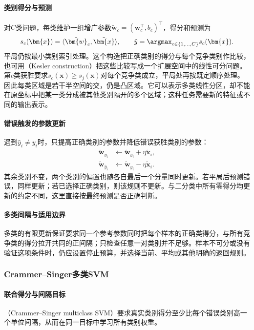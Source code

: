\paragraph{类别得分与预测}
对$C$类问题，每类维护一组增广参数$\tilde{\bm{w}}_c=(\bm{w}_c^{\top},b_c)^{\top}$，得分和预测为
\[
  s_c(\bm{x})=\langle\tilde{\bm{w}}_c,\tilde{\bm{x}}\rangle,
  \qquad
  \hat y=\argmax_{c\in\{1,\ldots,C\}}s_c(\bm{x}).
\]
平局仍按最小类别索引处理。这个构造把正确类别的得分与每个竞争类别作比较，也可用（Kesler construction）把这些比较写成一个扩展空间中的线性可分问题。第$c$类获胜要求$s_c(\bm x)\geq s_j(\bm x)$对每个竞争类成立，平局处再按既定顺序处理。因此每类区域是若干半空间的交，仍是凸区域。它可以表示多类线性分区，却不能在原坐标中把某一类分成被其他类别隔开的多个区域；这种任务需要新的特征或不同的输出表示。

\paragraph{错误触发的参数更新}
遇到$\hat y_i\ne y_i$时，只提高正确类别的参数并降低错误获胜类别的参数：
\begin{equation}
  \label{eq:classification-perceptron-multiclass-update}
  \begin{aligned}
    \tilde{\bm{w}}_{y_i}
      &\leftarrow\tilde{\bm{w}}_{y_i}+\eta\tilde{\bm{x}}_i,\\
    \tilde{\bm{w}}_{\hat y_i}
      &\leftarrow\tilde{\bm{w}}_{\hat y_i}-\eta\tilde{\bm{x}}_i .
  \end{aligned}
\end{equation}
其余类别不变，两个类别的偏置也随各自最后一个分量同时更新。若平局后预测错误，同样更新；若已选择正确类别，则该规则不更新。与二分类中所有零得分均更新的约定不同，这里直接按最终预测是否正确判断。

\paragraph{多类间隔与适用边界}
多类的有限更新保证要求同一个参考参数同时把每个样本的正确类得分，与所有竞争类的得分拉开共同的正间隔；只检查任意一对类别并不足够。样本不可分或没有验证这项条件时，仍应设置停止预算，并选择当前、平均或其他明确的返回规则。

\subsubsection{Crammer–Singer多类SVM}

\paragraph{联合得分与间隔目标}
（Crammer--Singer multiclass SVM）要求真实类别得分至少比每个错误类别高一个单位间隔，从而在同一目标中学习所有类别权重。

